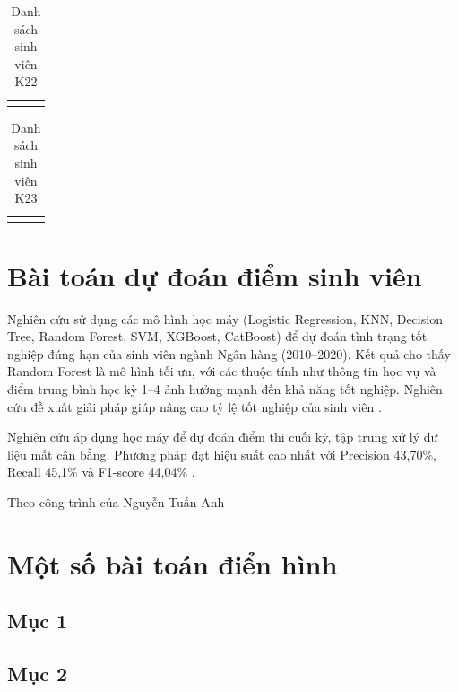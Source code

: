 \documentclass[12pt,a4paper,oneside]{report}
\begin{document}
\begin{table}[H]
  \centering
  \caption{Danh sách sinh viên K22}
  \label{tab:k22}
  \begin{tabular}{|C|C|C|}
    \hline
     &  &  \\ \hline
     &  &  \\ \hline
  \end{tabular}
\end{table}

\begin{table}[H]
  \centering
  \caption{Danh sách sinh viên K23}
  \label{tab:k23}
  \begin{tabular}{|C|C|C|}
    \hline
     &  &  \\ \hline
     &  &  \\ \hline
  \end{tabular}
\end{table}

\section{Bài toán dự đoán điểm sinh viên}

Nghiên cứu sử dụng các mô hình học máy (Logistic Regression, KNN,
Decision Tree, Random Forest, SVM, XGBoost, CatBoost) để dự đoán tình
trạng tốt nghiệp đúng hạn của sinh viên ngành Ngân hàng (2010--2020).
Kết quả cho thấy Random Forest là mô hình tối ưu, với các thuộc tính như
thông tin học vụ và điểm trung bình học kỳ 1--4 ảnh hưởng mạnh đến khả
năng tốt nghiệp. Nghiên cứu đề xuất giải pháp giúp nâng cao tỷ lệ tốt
nghiệp của sinh viên \cite{hai2017,thuan2022,thuy2023}.

Nghiên cứu áp dụng học máy để dự đoán điểm thi cuối kỳ, tập trung xử lý
dữ liệu mất cân bằng. Phương pháp đạt hiệu suất cao nhất với Precision
43,70\%, Recall 45,1\% và F1-score 44,04\% \cite{lananh,hai2017,thuan2022,thuy2023}.

Theo công trình của Nguyễn Tuấn Anh \cite{alquraishi2021,tuananh2024}

\section{Một số bài toán điển hình}

\subsection{Mục 1}

\subsection{Mục 2}
\end{document}
